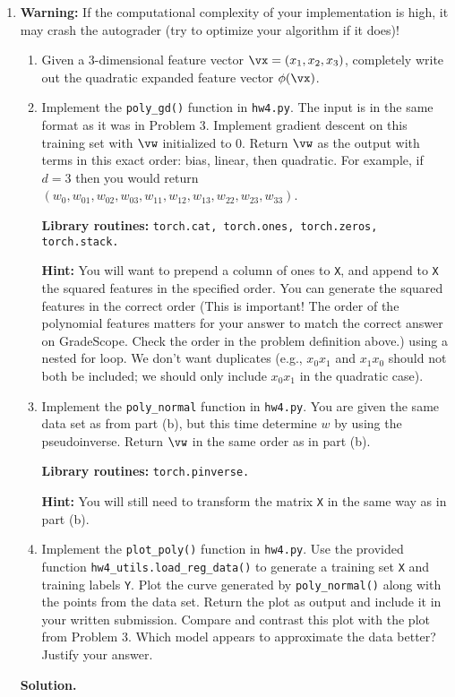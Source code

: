 \documentclass{article}
\theoremstyle{definition}
\theoremstyle{remark}
\newenvironment{Q}
{%
  \clearpage
  \item
  }
  {%
    \phantom{s} %
    \bigskip
    \textbf{Solution.}
  }
\begin{document}
\begin{enumerate}[font={\Large\bfseries},left=0pt]
\begin{Q}
  \textbf{Warning:} If the computational complexity of your implementation is high, it may crash the autograder (try to optimize your algorithm if it does)!
  \begin{enumerate}
  \item Given a $3$-dimensional feature vector $\vx = (x_1,x_2,x_3)$, completely write out the quadratic expanded feature vector $\phi(\vx)$.
  \item Implement the \texttt{poly\_gd()} function in \texttt{hw4.py}.  The input is in the same format as it was in Problem 3.  Implement gradient descent on this training set with $\vw$ initialized to 0.  Return $\vw$ as the output with terms in this exact order: bias, linear, then quadratic.  For example, if $d = 3$ then you would return $(w_0, w_{01},w_{02},w_{03},w_{11},w_{12},w_{13},w_{22},w_{23},w_{33})$.
  
  \textbf{Library routines:} \texttt{torch.cat, torch.ones, torch.zeros, torch.stack.}
  
  \textbf{Hint:} You will want to prepend a column of ones to \texttt{X}, and append to \texttt{X} the squared features in the specified order. You can generate the squared features in the correct order (This is important! The order of the polynomial features matters for your answer to match the correct answer on GradeScope. Check the order in the problem definition above.) using a nested for loop. We don't want duplicates (e.g., $x_0 x_1$ and $x_1 x_0$ should not both be included; we should only include $x_0 x_1$ in the quadratic case).
  
  \item Implement the \texttt{poly\_normal} function in \texttt{hw4.py}.  You are given the same data set as from part (b), but this time determine $w$ by using the pseudoinverse.  Return $\vw$ in the same order as in part (b).
  
  \textbf{Library routines:} \texttt{torch.pinverse.}
  
  \textbf{Hint:} You will still need to transform the matrix \texttt{X} in the same way as in part (b).
  
  \item Implement the \texttt{plot\_poly()} function in \texttt{hw4.py}.  Use the provided function \texttt{hw4\_utils.load\_reg\_data()} to generate a training set \texttt{X} and training labels \texttt{Y}. Plot the curve generated by \texttt{poly\_normal()} along with the points from the data set.  Return the plot as output and include it in your written submission.  Compare and contrast this plot with the plot from Problem 3.  Which model appears to approximate the data better? Justify your answer.
  

\end{enumerate}
\end{Q}
\end{enumerate}
\end{document}
